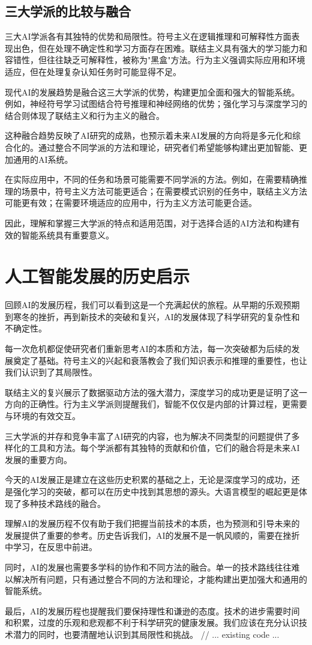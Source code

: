 \subsection{三大学派的比较与融合}

三大AI学派各有其独特的优势和局限性。符号主义在逻辑推理和可解释性方面表现出色，但在处理不确定性和学习方面存在困难。联结主义具有强大的学习能力和容错性，但往往缺乏可解释性，被称为"黑盒"方法。行为主义强调实际应用和环境适应，但在处理复杂认知任务时可能显得不足。

现代AI的发展趋势是融合这三大学派的优势，构建更加全面和强大的智能系统。例如，神经符号学习试图结合符号推理和神经网络的优势；强化学习与深度学习的结合则体现了联结主义和行为主义的融合。

这种融合趋势反映了AI研究的成熟，也预示着未来AI发展的方向将是多元化和综合化的。通过整合不同学派的方法和理论，研究者们希望能够构建出更加智能、更加通用的AI系统。

在实际应用中，不同的任务和场景可能需要不同学派的方法。例如，在需要精确推理的场景中，符号主义方法可能更适合；在需要模式识别的任务中，联结主义方法可能更有效；在需要环境适应的应用中，行为主义方法可能更合适。

因此，理解和掌握三大学派的特点和适用范围，对于选择合适的AI方法和构建有效的智能系统具有重要意义。

\section{人工智能发展的历史启示}

回顾AI的发展历程，我们可以看到这是一个充满起伏的旅程。从早期的乐观预期到寒冬的挫折，再到新技术的突破和复兴，AI的发展体现了科学研究的复杂性和不确定性。

每一次危机都促使研究者们重新思考AI的本质和方法，每一次突破都为后续的发展奠定了基础。符号主义的兴起和衰落教会了我们知识表示和推理的重要性，也让我们认识到了其局限性。

联结主义的复兴展示了数据驱动方法的强大潜力，深度学习的成功更是证明了这一方向的正确性。行为主义学派则提醒我们，智能不仅仅是内部的计算过程，更需要与环境的有效交互。

三大学派的并存和竞争丰富了AI研究的内容，也为解决不同类型的问题提供了多样化的工具和方法。每个学派都有其独特的贡献和价值，它们的融合将是未来AI发展的重要方向。

今天的AI发展正是建立在这些历史积累的基础之上，无论是深度学习的成功，还是强化学习的突破，都可以在历史中找到其思想的源头。大语言模型的崛起更是体现了多种技术路线的融合。

理解AI的发展历程不仅有助于我们把握当前技术的本质，也为预测和引导未来的发展提供了重要的参考。历史告诉我们，AI的发展不是一帆风顺的，需要在挫折中学习，在反思中前进。

同时，AI的发展也需要多学科的协作和不同方法的融合。单一的技术路线往往难以解决所有问题，只有通过整合不同的方法和理论，才能构建出更加强大和通用的智能系统。

最后，AI的发展历程也提醒我们要保持理性和谦逊的态度。技术的进步需要时间和积累，过度的乐观和悲观都不利于科学研究的健康发展。我们应该在充分认识技术潜力的同时，也要清醒地认识到其局限性和挑战。
// ... existing code ...

